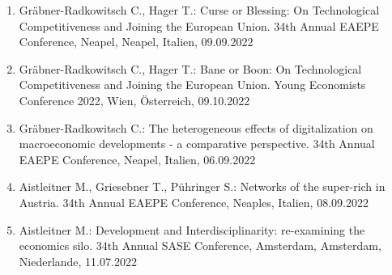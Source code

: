 \begin{enumerate}
	\item Gräbner-Radkowitsch C., Hager T.: Curse or Blessing: On Technological Competitiveness and Joining the European Union. 34th Annual EAEPE Conference, Neapel, Neapel, Italien, 09.09.2022
	\item Gräbner-Radkowitsch C., Hager T.: Bane or Boon: On Technological Competitiveness and Joining the European Union. Young Economists Conference 2022, Wien, Österreich, 09.10.2022
	\item Gräbner-Radkowitsch C.: The heterogeneous effects of digitalization on macroeconomic developments - a comparative perspective. 34th Annual EAEPE Conference, Neapel, Italien, 06.09.2022
	\item Aistleitner M., Griesebner T., Pühringer S.: Networks of the super-rich in Austria. 34th Annual EAEPE Conference, Neaples, Italien, 08.09.2022
	\item Aistleitner M.: Development and Interdisciplinarity: re-examining the \glqq economics silo\grqq{}. 34th Annual SASE Conference, Amsterdam, Amsterdam, Niederlande, 11.07.2022
\end{enumerate}
